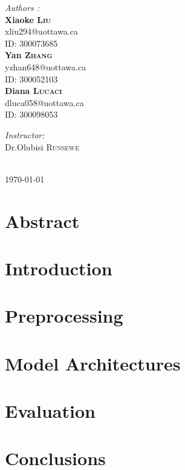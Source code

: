 \documentclass[10pt]{article}
\begin{document}
\begin{titlepage}
\begin{minipage}{0.4\textwidth}
\begin{flushleft} \large
\emph{Authors :}\\\textbf{Xiaoke \textsc{Liu}}\\xliu294@uottawa.ca\\ID: 300073685
\\\textbf{Yan \textsc{Zhang}}\\yzhan648@uottawa.ca\\ID: 300052103
\\\textbf{Diana \textsc{Lucaci}}\\dluca058@uottawa.ca\\ID: 300098053
\end{flushleft}
\end{minipage}
\begin{minipage}{0.4\textwidth}
\begin{flushright} \large
\emph{Instructor:} \\
Dr.Olubisi \textsc{Runsewe}\\
\end{flushright}
\end{minipage}\\[0.5cm]
{\large \today}\\[1cm]

\vfill %

\end{titlepage}

\tableofcontents          %
\listoffigures
\listoftables
\newpage
\section{Abstract}


\section{Introduction}


\section{Preprocessing}


\section{Model Architectures}


\section{Evaluation} \label{evaluation}



\section{Conclusions}

\clearpage


\begin{appendices}\label{app}

\end{appendices}
\end{document}
